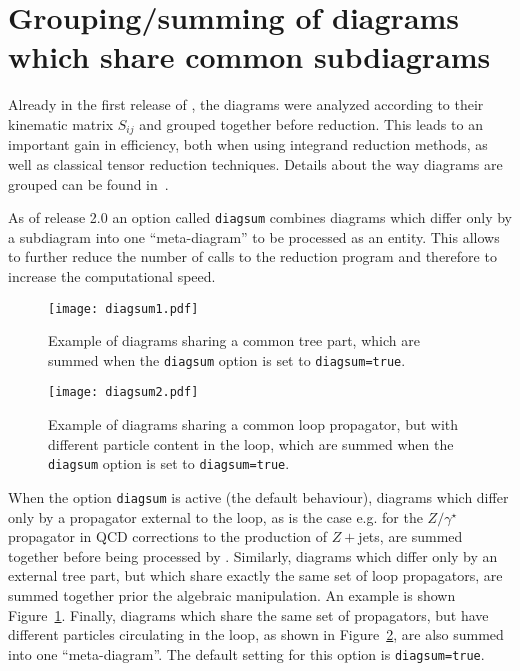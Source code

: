 \section{Grouping/summing of diagrams which share common subdiagrams}
\label{sec:grouping_summing}
Already in the first release of \gosam{}, the diagrams were analyzed
according to their kinematic matrix $S_{ij}$ and grouped together
before reduction. This leads to an important gain in efficiency, both
when using integrand reduction methods, as well as 
classical tensor reduction techniques. Details about the way diagrams
are grouped can be found in~\cite{Cullen:2011ac}.

As of release 2.0 an option called \texttt{diagsum} combines diagrams
which differ only by a subdiagram into one ``meta-diagram'' to be
processed as an entity. This allows to further reduce the number of
calls to the reduction program and therefore to increase the
computational speed. 

\begin{figure}[htb]
\centering
\texttt{[image: diagsum1.pdf]}
\caption{Example of diagrams sharing a common tree part, which are 
summed when the \texttt{diagsum} option is set to \texttt{diagsum=true}.}
\label{fig:diagsum_tree}
\end{figure} 

\begin{figure}[htb]
\centering
\texttt{[image: diagsum2.pdf]}
\caption{Example of diagrams sharing a common loop propagator, 
but with different particle content in the loop, which are summed when
the \texttt{diagsum} option is set to \texttt{diagsum=true}.}
\label{fig:diagsum_particle}
\end{figure} 


When the option \texttt{diagsum} is active (the default behaviour), diagrams which differ only by
a propagator external to the loop, as is the case e.g. for the
$Z/\gamma^\star$ propagator in QCD corrections to the production of
$Z+$jets, are summed together before being processed
by \form{}. Similarly, diagrams which differ only by an external tree
part, but which share exactly the same set of loop propagators, are
summed together prior the algebraic manipulation. An example is shown
Figure~\ref{fig:diagsum_tree}. Finally, diagrams which share the same
set of propagators, but have different particles circulating in the
loop, as shown in Figure~\ref{fig:diagsum_particle}, are also summed
into one ``meta-diagram''. The default setting for this option is \texttt{diagsum=true}.



